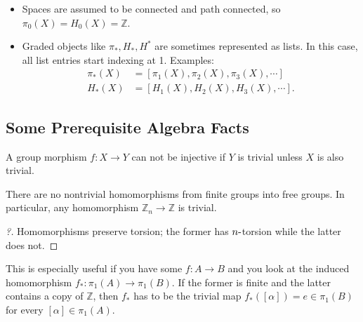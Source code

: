 \begin{itemize}
\item
  Spaces are assumed to be connected and path connected, so
  \(\pi_0(X) = H_0(X) = {\mathbb{Z}}\).
\item
  Graded objects like \(\pi_*, H_*, H^*\) are sometimes represented as
  lists. In this case, all list entries start indexing at 1. Examples:
  \begin{align*}
    \pi_*(X) &= [\pi_1(X), \pi_2(X), \pi_3(X), \cdots] \\
    H_*(X) &= [H_1(X), H_2(X), H_3(X), \cdots]
  .\end{align*}
\end{itemize}

\hypertarget{some-prerequisite-algebra-facts}{%
\subsection{Some Prerequisite Algebra
Facts}\label{some-prerequisite-algebra-facts}}

\begin{fact}

A group morphism \(f:X \to Y\) can not be injective if \(Y\) is trivial
unless \(X\) is also trivial.

\end{fact}

\begin{proposition}

There are no nontrivial homomorphisms from finite groups into free
groups. In particular, any homomorphism
\({\mathbb{Z}}_n \to {\mathbb{Z}}\) is trivial.

\end{proposition}

\begin{proof}[?]

Homomorphisms preserve torsion; the former has \(n{\hbox{-}}\)torsion
while the latter does not.

\end{proof}

\begin{remark}

This is especially useful if you have some \(f: A\to B\) and you look at
the induced homomorphism \(f_*: \pi_1(A) \to\pi_1(B)\). If the former is
finite and the latter contains a copy of \({\mathbb{Z}}\), then \(f_*\)
has to be the trivial map \(f_*([\alpha]) = e \in \pi_1(B)\) for every
\([\alpha] \in \pi_1(A)\).

\end{remark}

